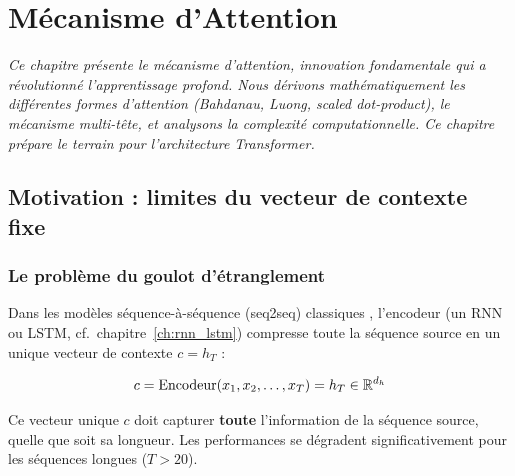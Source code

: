 \chapter{M\'ecanisme d'Attention}
\label{ch:attention}

\noindent\textit{Ce chapitre pr\'esente le m\'ecanisme d'attention, innovation fondamentale
qui a r\'evolutionn\'e l'apprentissage profond. Nous d\'erivons
math\'ematiquement les diff\'erentes formes d'attention (Bahdanau, Luong,
scaled dot-product), le m\'ecanisme multi-t\^ete, et analysons la
complexit\'e computationnelle. Ce chapitre pr\'epare le terrain pour
l'architecture Transformer.}\medskip

\section{Motivation : limites du vecteur de contexte fixe}
\label{sec:attention-motivation}

\subsection{Le probl\`eme du goulot d'\'etranglement}

Dans les mod\`eles s\'equence-\`a-s\'equence (seq2seq) classiques
\cite{sutskever2014sequence}, l'encodeur (un RNN ou LSTM, cf.\
chapitre~\ref{ch:rnn_lstm}) compresse toute la s\'equence source en un
unique vecteur de contexte $c = h_T$ :

\begin{equation}
c = \text{Encodeur}(x_1, x_2, \ldots, x_T) = h_T \in \mathbb{R}^{d_h}
\end{equation}

\begin{attention}[title=\textbf{Goulot d'\'etranglement informationnel}]
Ce vecteur unique $c$ doit capturer \textbf{toute} l'information de la
s\'equence source, quelle que soit sa longueur. Les performances se
d\'egradent significativement pour les s\'equences longues ($T > 20$).
\end{attention}


